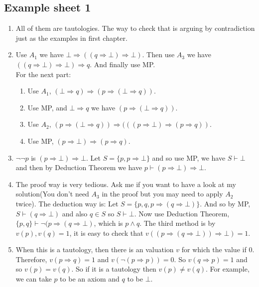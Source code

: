 \subsection{Example sheet 1}
\begin{enumerate}
\item All of them are tautologies. The way to check that is arguing by contradiction just as the examples in first chapter.\\
\item Use $A_1$ we have $\bot \Rightarrow ((q \Rightarrow \bot) \Rightarrow \bot)$. Then use $A_3$ we have $((q \Rightarrow \bot) \Rightarrow \bot) \Rightarrow q$. And finally use MP.\\
For the next part:
\begin{enumerate}
\item Use $A_1$, $(\bot \Rightarrow q) \Rightarrow (p \Rightarrow (\bot \Rightarrow q))$.\\
\item Use MP, and $\bot \Rightarrow q$ we have $(p \Rightarrow (\bot \Rightarrow q))$.\\
\item Use $A_2$, $(p \Rightarrow (\bot \Rightarrow q)) \Rightarrow (((p \Rightarrow \bot) \Rightarrow (p \Rightarrow q))$.\\
\item Use MP, $(p \Rightarrow \bot) \Rightarrow (p \Rightarrow q)$.
\end{enumerate}
\item $\neg \neg p$ is $(p \Rightarrow \bot) \Rightarrow \bot$. Let $S = \{p,p\Rightarrow \bot\}$ and so use MP, we have $S \vdash \bot$ and then by Deduction Theorem we have $p \vdash (p \Rightarrow \bot) \Rightarrow \bot$.\\
\item The proof way is very tedious. Ask me if you want to have a look at my solution(You don't need $A_3$ in the proof but you may need to apply $A_2$ twice). The deduction way is: Let $S=\{p,q, p \Rightarrow (q \Rightarrow \bot)\}$. And so by MP, $S \vdash (q \Rightarrow \bot)$ and also $q \in S$ so $S \vdash \bot$. Now use Deduction Theorem, $\{p,q\} \vdash \neg (p \Rightarrow (q \Rightarrow \bot)$, which is $p \wedge q$. The third method is by $v(p),v(q)=1$, it is easy to check that $v((p \Rightarrow (q \Rightarrow \bot)) \Rightarrow \bot)=1$.\\
\item When this is a tautology, then there is an valuation $v$ for which the value if $0$. Therefore, $v(p \Rightarrow q)=1$ and $v(\neg (p \Rightarrow p))=0$. So $v(q \Rightarrow p)=1$ and so $v(p)=v(q)$. So if it is a tautology then $v(p) \neq v(q)$. For example, we can take $p$ to be an axiom and $q$ to be $\bot$.\\

\end{enumerate}
